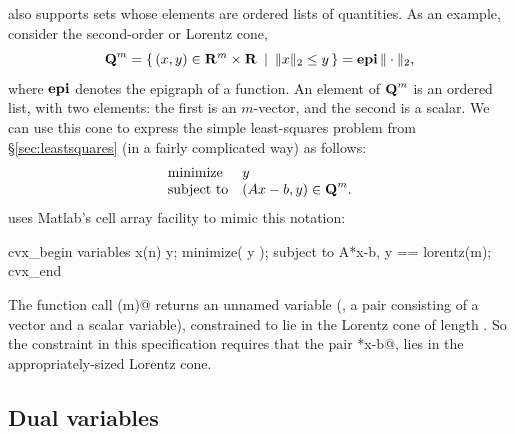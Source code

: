 \documentclass[12pt]{article}
\newcommand{\lorentz}{{\mbox{\bf Q}}}  %
\begin{document}
\cvx also supports sets whose elements are ordered
lists of quantities.  As an example, consider the second-order or 
Lorentz cone,
\begin{equation}
	\lorentz^m = \Condset{ (x,y) \in \R^m\times\R }{ \| x \|_2 \leq y } = \epi \|\cdot\|_2,
\end{equation}
where $\operatorname{\textbf{epi}}$ denotes the epigraph of a function.
An element of $\lorentz^m$ is an ordered list, with two elements:
the first is an $m$-vector, and the second is a scalar.
We can use this cone to express the simple least-squares problem 
from \S\ref{sec:leastsquares} (in a fairly complicated way)
as follows:
\begin{equation}
	\begin{array}{ll}
		\text{minimize}   & y \\
		\text{subject to} & ( A x - b, y ) \in \lorentz^m.
	\end{array}
\end{equation}
\cvx uses Matlab's cell array facility to mimic this notation:
\begin{code}
	cvx_begin
	    variables x(n) y;
	    minimize( y );
	    subject to
	        { A*x-b, y } == lorentz(m);
	cvx_end
\end{code}
The function call \verb@lorentz(m)@ returns
an unnamed variable (\ie, a pair consisting of a vector and a 
scalar variable),
constrained to lie in the Lorentz cone of length \verb@m@. 
So the constraint in this
specification requires that the pair \verb@A*x-b@, \verb@y@
lies in the appropriately-sized Lorentz cone.

\subsection{Dual variables}
\end{document}

